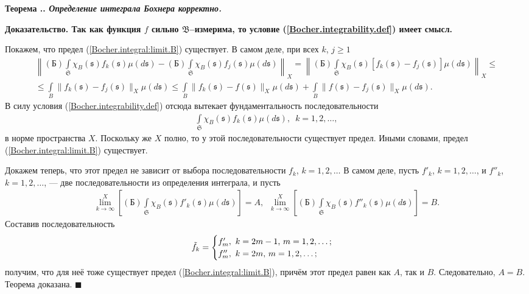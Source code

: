 \documentclass{report}
\newcounter{rem}[section]
\newcounter{theor}[section]
\renewcommand{\thetheor}{\thesection.\arabic{theor}}
\newenvironment{Theorem}{\par\refstepcounter{theor}\bf Теорема \thetheor. \it}{\rm\par}
\newenvironment{Proof}{\par\noindent\bf Доказательство.\rm}{ $\blacksquare$\par}
\begin{document}
\begin{Theorem}
Определение интеграла Бохнера корректно.
\end{Theorem}
\begin{Proof}
Так как функция $f$ сильно $\mathfrak{B}$--измерима, то условие (\ref{Bocher.integrability.def}) имеет смысл.

Покажем, что предел (\ref{Bocher.integral:limit.B}) существует. В самом деле, при всех $k$, $j\geqslant1$
\begin{gather*}
\left\|(\textrm{Б})\int\limits_{\mathfrak{S}}\chi_B(\mathfrak{s})f_k(\mathfrak{s})\mu(d\mathfrak{s})-(\textrm{Б})\int\limits_{\mathfrak{S}}\chi_B(\mathfrak{s})f_j(\mathfrak{s}
)\mu(d\mathfrak{s})\right\|_X=\left\|(\textrm{Б})\int\limits_{\mathfrak{S}}\chi_B(\mathfrak{s})[f_k(\mathfrak{s})-f_j(\mathfrak{s})]\mu(d\mathfrak{s})\right\|_X\leqslant\\
\leqslant\int\limits_{B}\|f_k(\mathfrak{s})-f_j(\mathfrak{s})\|_X\mu(d\mathfrak{s})\leqslant\int\limits_{B}\|f_k(\mathfrak{s})-f(\mathfrak{s})\|_X\mu(d\mathfrak{s})+
\int\limits_{B}\|f(\mathfrak{s})-f_j(\mathfrak{s})\|_X\mu(d\mathfrak{s}).
\end{gather*}
В силу условия (\ref{Bocher.integrability.def}) отсюда вытекает фундаментальность последовательности
\begin{gather*}
\int\limits_{\mathfrak{S}}\chi_B(\mathfrak{s})f_k(\mathfrak{s})\mu(d\mathfrak{s}),\,\,\,k=1,2,\dots,
\end{gather*}
в норме пространства $X$. Поскольку же $X$ полно, то у этой последовательности существует предел. Иными словами, предел (\ref{Bocher.integral:limit.B}) существует.

Докажем теперь, что этот предел не зависит от выбора последовательности $f_k$, $k=1,2,\dots$ В самом деле, пусть $f'_k$, $k=1,2,\dots$, и $f''_k$, $k=1,2,\dots$, --- две последовательности
из определения интеграла, и пусть
\begin{gather*}
\lim\limits_{k\to\infty}^X\left[(\textrm{Б})\int\limits_{\mathfrak{S}}\chi_B(\mathfrak{s})f'_k(\mathfrak{s})\mu(d\mathfrak{s})\right]=A,\,\,\,
\lim\limits_{k\to\infty}^X\left[(\textrm{Б})\int\limits_{\mathfrak{S}}\chi_B(\mathfrak{s})f''_k(\mathfrak{s})\mu(d\mathfrak{s})\right]=B.
\end{gather*}
Составив последовательность
\begin{gather*}
\tilde{f}_k=
\begin{cases}
f'_m,\text{ $k=2m-1$, $m=1,2,\dots$;}\cr
f''_m,\text{ $k=2m$, $m=1,2,\dots$;}
\end{cases}
\end{gather*}
получим, что для неё тоже существует предел (\ref{Bocher.integral:limit.B}), причём этот предел равен как $A$, так и $B$. Следовательно, $A=B$. Теорема доказана.
\end{Proof}
\end{document}
